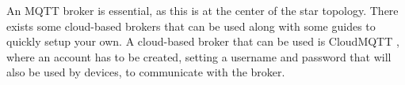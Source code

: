 An MQTT broker is essential, as this is at the center of the star topology. There exists some cloud-based brokers that can be used along with some guides to quickly setup your own. A cloud-based broker that can be used is CloudMQTT \cite{CloudMQTT}, where an account has to be created, setting a username and password that will also be used by devices, to communicate with the broker. 

